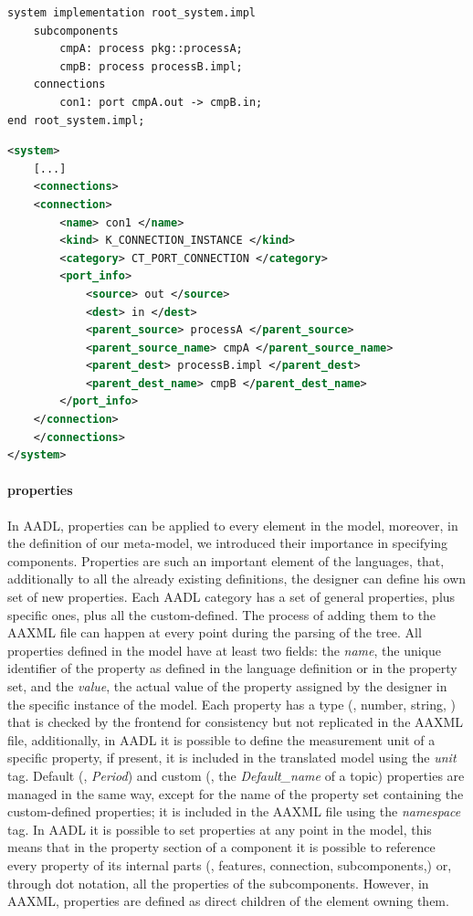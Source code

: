\begin{lstlisting}[language=AADL,caption={Minimal AADL model containing connections.},label=lst:con-aadl]
system implementation root_system.impl
	subcomponents
		cmpA: process pkg::processA;
		cmpB: process processB.impl;
	connections
		con1: port cmpA.out -> cmpB.in;
end root_system.impl;
\end{lstlisting}

\bigskip

\begin{lstlisting}[language=XML,caption={AAXML description of AADL connections},label=lst:con-aaxml]
<system>
	[...]
	<connections>
	<connection>
		<name> con1 </name>
		<kind> K_CONNECTION_INSTANCE </kind>
		<category> CT_PORT_CONNECTION </category>
		<port_info>
			<source> out </source>
			<dest> in </dest>
			<parent_source> processA </parent_source>
			<parent_source_name> cmpA </parent_source_name>
			<parent_dest> processB.impl </parent_dest>
			<parent_dest_name> cmpB </parent_dest_name>
		</port_info>
	</connection>
	</connections>
</system>
\end{lstlisting}

\paragraph{properties} In AADL, properties can be applied to every element in the model, moreover, in the definition of our meta-model, we introduced their importance in specifying components. Properties are such an important element of the languages, that, additionally to all the already existing definitions, the designer can define his own set of new properties. Each AADL category has a set of general properties, plus specific ones, plus all the custom-defined. The process of adding them to the AAXML file can happen at every point during the parsing of the tree. All properties defined in the model have at least two fields: the \textit{name}, the unique identifier of the property as defined in the language definition or in the property set, and the \textit{value}, the actual value of the property assigned by the designer in the specific instance of the model. Each property has a type (\eg, number, string, \etc) that is checked by the frontend for consistency but not replicated in the AAXML file, additionally, in AADL it is possible to define the measurement unit of a specific property, if present, it is included in the translated model using the \textit{unit} tag. Default (\eg, \textit{Period}) and custom (\eg, the \textit{Default\_name} of a topic) properties are managed in the same way, except for the name of the property set containing the custom-defined properties; it is included in the AAXML file using the \textit{namespace} tag. In AADL it is possible to set properties at any point in the model, this means that in the property section of a component it is possible to reference every property of its internal parts (\eg, features, connection, subcomponents,\etc) or, through dot notation, all the properties of the subcomponents. However, in AAXML, properties are defined as direct children of the element owning them.

